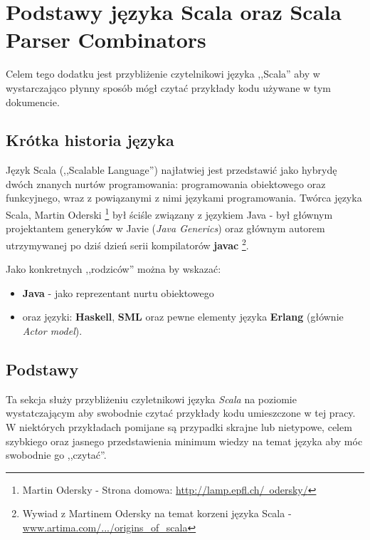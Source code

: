 \chapter{Podstawy języka Scala oraz Scala Parser Combinators}
\label{cha:appendixB}
Celem tego dodatku jest przybliżenie czytelnikowi języka ,,Scala'' aby w wystarczająco płynny sposób mógł czytać przykłady kodu używane w tym dokumencie.

\section{Krótka historia języka}
\label{sec:scala_history}
Język Scala (,,Scalable Language'') najłatwiej jest przedstawić jako hybrydę dwóch znanych nurtów programowania: programowania obiektowego oraz funkcyjnego, wraz z 
powiązanymi z nimi językami programowania. Twórca języka Scala, Martin Oderski \footnote{Martin Odersky - Strona domowa: \href{http://lamp.epfl.ch/~odersky/}{http://lamp.epfl.ch/~odersky/}}
był ściśle związany z językiem Java - był głównym projektantem generyków w Javie (\textit{Java Generics}) oraz głównym autorem utrzymywanej po dziś dzień
serii kompilatorów \textbf{javac} \footnote{Wywiad z Martinem Odersky na temat korzeni języka Scala - \href{http://www.artima.com/scalazine/articles/origins_of_scala.html}{www.artima.com/.../origins\_of\_scala}}.

Jako konkretnych ,,rodziców'' można by wskazać: 
\begin{itemize}
 \item \textbf{Java} - jako reprezentant nurtu obiektowego 
 \item oraz języki: \textbf{Haskell}, \textbf{SML} oraz pewne elementy języka \textbf{Erlang} (głównie \textit{Actor model}).
\end{itemize}


\section{Podstawy}
\label{sec:scala_basics}
Ta sekcja służy przybliżeniu czyletnikowi języka \textit{Scala} na poziomie wystatczającym aby swobodnie czytać przykłady
kodu umieszczone w tej pracy. W niektórych przykładach pomijane są przypadki skrajne lub nietypowe, celem szybkiego oraz 
jasnego przedstawienia minimum wiedzy na temat języka aby móc swobodnie go ,,czytać''.

